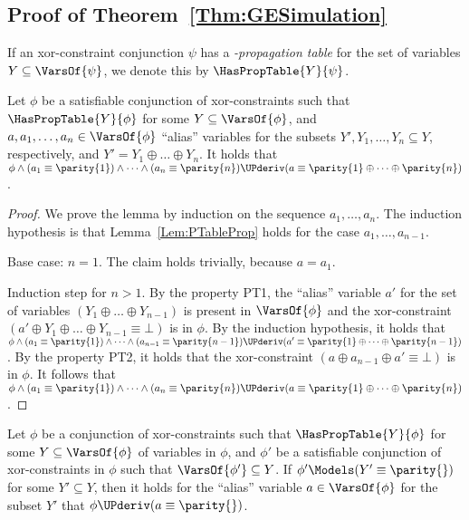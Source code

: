 \subsection{Proof of Theorem~\ref{Thm:GESimulation}}

If an xor-constraint conjunction $\psi$ has a {\it \UP{}-propagation table} for
the set of variables $Y \subseteq \VarsOf{\psi}$, we denote this by
$\HasPropTable{Y}{\psi}$. 



\begin{lemma}
\label{Lem:PTableProp}
Let $ \phi $ be a satisfiable conjunction of xor-constraints such that $
\HasPropTable{Y}{\phi} $ for some $ Y \subseteq
\VarsOf{\phi} $, and $ a, a_1, \dots, a_n
\in \VarsOf{\phi} $ ``alias'' variables for the subsets $Y', Y_1, \dots,
    Y_n \subseteq Y$, respectively, and $ Y' = Y_1 \oplus \dots \oplus Y_n $.
It holds that $ \phi \wedge (a_1 \equiv \parity{1}) \wedge \dots \wedge
(a_n \equiv \parity{n}) \UPderiv (a \equiv \parity{1} \oplus \dots \oplus
    \parity{n})$.
\end{lemma}


\begin{proof}
We prove the lemma by induction on the sequence $ a_1, \dots, a_n $.
The induction hypothesis is that Lemma~\ref{Lem:PTableProp} holds for the
case $a_1, \dots, a_{n-1} $.

Base case: $n = 1$.
The claim holds trivially, because $a = a_1$.

Induction step for $ n > 1 $. 
By the property PT1, the ``alias'' variable $a'$ for the set of variables $(Y_1 \oplus \dots \oplus Y_{n-1})$ is present in $\VarsOf{\phi}$ and the xor-constraint $ (a' \oplus Y_1 \oplus
        \dots \oplus Y_{n-1} \equiv \bot) $ is in $\phi$.
By the induction hypothesis, it holds that $ \phi \wedge (a_1 \equiv
        \parity{1}) \wedge \dots \wedge (a_{n-1} \equiv \parity{n-1}) \UPderiv
(a' \equiv \parity{1} \oplus \dots \oplus \parity{n-1}) $.
By the property PT2, it holds that the xor-constraint $ (a \oplus a_{n-1}
\oplus a' \equiv \bot) $ is in $ \phi$.
It follows that $ \phi \wedge (a_1 \equiv \parity{1}) \wedge \dots \wedge (a_n \equiv \parity{n}) \UPderiv (a \equiv \parity{1} \oplus \dots \oplus \parity{n}) $.

\end{proof}

\begin{lemma}
\label{Lem:PTableProp2}
Let $ \phi $ be a conjunction of xor-constraints such that $
\HasPropTable{Y}{\phi} $ for some $ Y \subseteq \VarsOf{\phi} $
of variables in $\phi$, and $ \phi' $ be a satisfiable conjunction of
xor-constraints in $\phi$ such that $ \VarsOf{\phi'} \subseteq Y$.
If $ \phi' \Models (Y' \equiv \parity{}) $ for some $Y' \subseteq Y$, then
it holds for the ``alias'' variable $ a \in \VarsOf{\phi} $ for the subset $Y'$ that $ \phi \UPderiv (a \equiv \parity{}) $.
\end{lemma}


